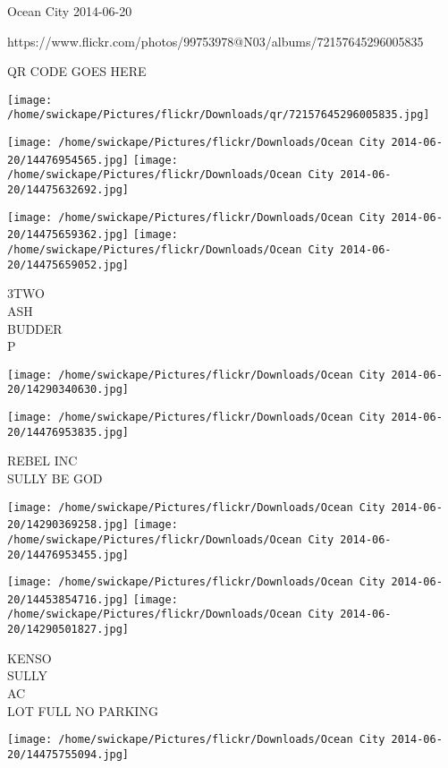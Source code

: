 \documentclass[10pt,letterpaper]{article}
\begin{document}
Ocean City 2014-06-20

https://www.flickr.com/photos/99753978@N03/albums/72157645296005835

QR CODE GOES HERE

\texttt{[image: /home/swickape/Pictures/flickr/Downloads/qr/72157645296005835.jpg]}
\pagebreak

\texttt{[image: /home/swickape/Pictures/flickr/Downloads/Ocean City 2014-06-20/14476954565.jpg]}
\texttt{[image: /home/swickape/Pictures/flickr/Downloads/Ocean City 2014-06-20/14475632692.jpg]}

\texttt{[image: /home/swickape/Pictures/flickr/Downloads/Ocean City 2014-06-20/14475659362.jpg]}
\texttt{[image: /home/swickape/Pictures/flickr/Downloads/Ocean City 2014-06-20/14475659052.jpg]}

3TWO\\
ASH\\
BUDDER\\
P\\
\pagebreak

\texttt{[image: /home/swickape/Pictures/flickr/Downloads/Ocean City 2014-06-20/14290340630.jpg]}

\vspace{0.25in}
\texttt{[image: /home/swickape/Pictures/flickr/Downloads/Ocean City 2014-06-20/14476953835.jpg]}

REBEL INC\\
SULLY BE GOD\\
\pagebreak

\texttt{[image: /home/swickape/Pictures/flickr/Downloads/Ocean City 2014-06-20/14290369258.jpg]}
\texttt{[image: /home/swickape/Pictures/flickr/Downloads/Ocean City 2014-06-20/14476953455.jpg]}

\texttt{[image: /home/swickape/Pictures/flickr/Downloads/Ocean City 2014-06-20/14453854716.jpg]}
\texttt{[image: /home/swickape/Pictures/flickr/Downloads/Ocean City 2014-06-20/14290501827.jpg]}

KENSO\\
SULLY\\
AC\\
LOT FULL NO PARKING\\
\pagebreak

\texttt{[image: /home/swickape/Pictures/flickr/Downloads/Ocean City 2014-06-20/14475755094.jpg]}
\end{document}

